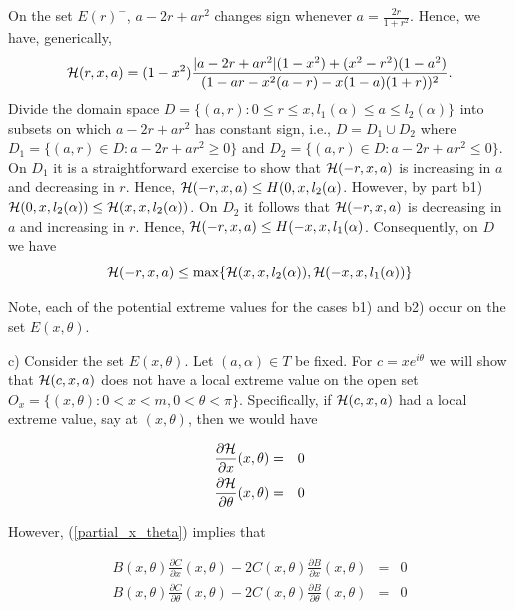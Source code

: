 \documentclass[12pt]{article}
\begin{document}
\vspace{0.1in}

On the set $E(r)^{-}$, $a -2r + ar^2$ changes sign whenever $a = \frac{2r}{1+r^2}$.  Hence, we have,
generically, 
$$
{\cal H}(r,x,a) = (1-x^2)\frac{|a-2r+ar^2|(1-x^2)+(x^2-r^2)(1-a^2)}{( 1 - ar-x^2(a-r) - x(1-a)(1+r) )^2} .
$$
Divide the domain space $D = \{(a,r) : 0 \le r \le x, l_1(\alpha) \le a \le l_2(\alpha)\}$ into subsets on which $a -2r + ar^2$ has constant sign, i.e., $D = D_1 \cup D_2$ where $D_1 = \{ (a,r) \in D : a -2r + ar^2 \ge 0 \}$ and 
$D_2 = \{ (a,r) \in D : a -2r + ar^2 \le 0 \}$.  On $D_1$ it is a straightforward exercise to show that ${\cal H}(-r,x,a)$ is increasing in $a$ and decreasing in $r$.  Hence, ${\cal H}(-r,x,a) \le {\cal }H(0,x,l_2(\alpha)$.  However, by part b1) 
${\cal H}(0,x,l_2(\alpha)) \le {\cal H}(x,x,l_2(\alpha))$.  On $D_2$ it follows that ${\cal H}(-r,x,a)$ is decreasing in $a$ and increasing in $r$.  Hence, ${\cal H}(-r,x,a) \le {\cal }H(-x,x,l_1(\alpha)$.  Consequently, on $D$ we have
$$
{\cal H}(-r,x,a) \le \max \{{\cal H}(x,x,l_2(\alpha)),{\cal H}(-x,x,l_1(\alpha))\}
$$

Note, each of the potential extreme values for the cases b1) and b2) occur on the set $E(x,\theta)$.

\vspace{0.1in}

c) Consider the set $E(x,\theta)$.  Let $(a,\alpha) \in T$ be fixed.  For $c = xe^{i\theta}$ 
we will show that ${\cal H}(c,x,a)$ 
does not have a local extreme value on the open set $O_x = \{(x,\theta) : 0 < x < m, 0 < \theta < \pi \}$.  
Specifically, if ${\cal H}(c,x,a)$ had a local extreme value, say at $(x,\theta)$, then
we would have 

\begin{eqnarray} \label{partial_x_theta}
\frac{\partial {\cal H}}{\partial x}{(x,\theta)} &=& 0 \\ \nonumber
\frac{\partial {\cal H}}{\partial \theta}{(x,\theta)} &=& 0
\end{eqnarray}

However, (\ref{partial_x_theta}) implies that 

\begin{eqnarray*} 
B(x,\theta)\frac{\partial {C}}{\partial x}{(x,\theta)} - 2C(x,\theta)\frac{\partial {B}}{\partial x}{(x,\theta)}&=& 0 \\ \nonumber
B(x,\theta)\frac{\partial {C}}{\partial \theta}{(x,\theta)} - 2C(x,\theta)\frac{\partial {B}}{\partial \theta}{(x,\theta)}&=& 0 
\end{eqnarray*}
\end{document}
